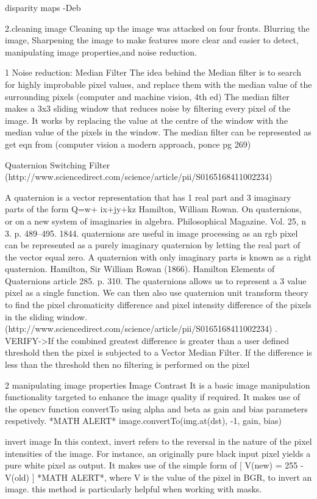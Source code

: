 disparity maps
-Deb

2.cleaning image
Cleaning up the image was attacked on four fronts. Blurring the image, Sharpening the image to make features more clear and easier to detect, manipulating image properties,and noise reduction. 

1 Noise reduction:
Median Filter
The idea behind the Median filter is to search for highly improbable pixel values, and replace them with the median value of the surrounding pixels (computer and machine vision, 4th ed)
The median filter makes a 3x3 sliding window that reduces noise by filtering every pixel of the image. It works by replacing the value at the centre of the window with the median value of the pixels in the window.
The median filter can be represented as get eqn from  (computer vision a modern approach, ponce pg 269)
 
Quaternion Switching Filter
(http://www.sciencedirect.com/science/article/pii/S0165168411002234)

A quaternion is a vector representation that has 1 real part and 3 imaginary parts of the form 
Q=w+ ix+jy+kz
Hamilton, William Rowan. On quaternions, or on a new system of imaginaries in algebra. Philosophical Magazine. Vol. 25, n 3. p. 489–495. 1844.
quaternions are useful in image processing as an rgb pixel can be represented as a purely imaginary quaternion by letting the real part of the vector equal zero. A quaternion with only imaginary parts is known as a right quaternion. Hamilton, Sir William Rowan (1866). Hamilton Elements of Quaternions article 285. p. 310.
The quaternions allows us to represent a 3 value pixel as a single function. We can then also use quaternion unit transform theory to find the pixel chromaticity difference and pixel intensity difference of the pixels in the sliding window.(http://www.sciencedirect.com/science/article/pii/S0165168411002234) 
. VERIFY->If the combined greatest difference is greater than a user defined threshold then the pixel is subjected to a Vector Median Filter. If the difference is less than the threshold then no filtering is performed on the pixel

2 manipulating image properties
Image Contrast
It is a basic image manipulation functionality targeted to enhance the image quality if required.
It makes use of the opencv function convertTo using alpha and beta as gain and bias parameters respetively.
*MATH ALERT*
image.convertTo(img.at(dst), -1, gain, bias)

invert image
In this context, invert refers to the reversal in the nature of the pixel intensities of the image.
For instance, an originally pure black input pixel yields a pure white pixel as output.
It makes use of the simple form of  [ V(new) = 255 - V(old) ] *MATH ALERT*, where V is the value of the pixel in BGR, to invert an image. 
this method is particularly helpful when working with masks.

